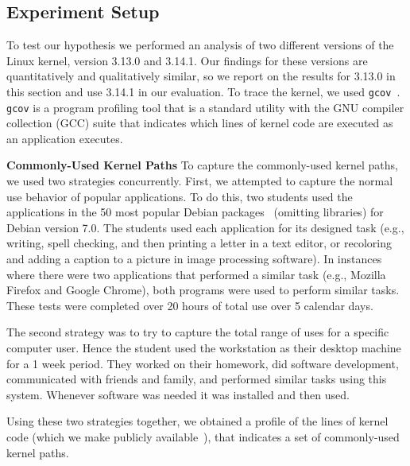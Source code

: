\subsection{Experiment Setup}

To test our hypothesis we performed an analysis of two different versions of
the Linux kernel, version 3.13.0 and 3.14.1.  Our findings for these 
versions are quantitatively and qualitatively similar, so we report on 
the results for 3.13.0 in this section and use 3.14.1 in our evaluation.
To trace the kernel, we used \texttt{gcov}~\cite{gcov}.  
\texttt{gcov} is a program profiling
tool that is a standard utility with the GNU compiler collection
(GCC) suite that indicates which lines of kernel code are executed as an
application executes.

\textbf{Commonly-Used Kernel Paths}
To capture the commonly-used kernel paths, we used two strategies concurrently.
First, we attempted to capture the normal use behavior of popular applications.
To do this, two students used the 
applications in the 50 most popular Debian packages~\cite{Top-Packages} 
(omitting libraries) for Debian version 7.0. 
The students used each application for its designed
task (e.g., writing, spell checking, and then printing a letter in a text
editor, or recoloring and adding a caption to a picture in image processing 
software).  In instances where there were two applications that performed a 
similar task (e.g., Mozilla Firefox and Google Chrome), both programs were
used to perform similar tasks.  These tests were completed over 20 hours of
total use over 5 calendar days. 

The second strategy was to try to capture the total range of uses for a 
specific computer user.  Hence the student used the workstation as their
desktop machine for a 1 week period.  They worked on their homework, did
software development, communicated with friends and family, and performed
similar tasks using this system.  Whenever software was needed 
it was installed and then used. 

Using these two strategies together, we obtained a profile of the lines of
kernel code (which we make publicly available~), that indicates
a set of commonly-used kernel paths.

